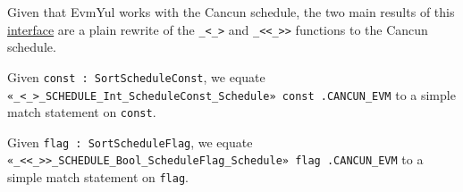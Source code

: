 Given that EvmYul works with the Cancun schedule, the two main results of this
\href{https://runtimeverification.github.io/evm-equivalence/docs/EvmEquivalence/Interfaces/GasInterface.html}{interface}
are a plain rewrite of the \texttt{_<_>} and \texttt{_<<_>>} functions to the
Cancun schedule.

\begin{theorem}
\label{thm:cancun_def}\leanok{}
Given \texttt{const : SortScheduleConst}, we equate
\texttt{«_<_>_SCHEDULE_Int_ScheduleConst_Schedule» const .CANCUN_EVM} to a
simple match statement on \texttt{const}.
\end{theorem}

\begin{theorem}
\label{thm:flag_cancun_def}\leanok{}
Given \texttt{flag : SortScheduleFlag}, we equate
\texttt{«_<<_>>_SCHEDULE_Bool_ScheduleFlag_Schedule» flag .CANCUN_EVM} to a
simple match statement on \texttt{flag}.
\end{theorem}
